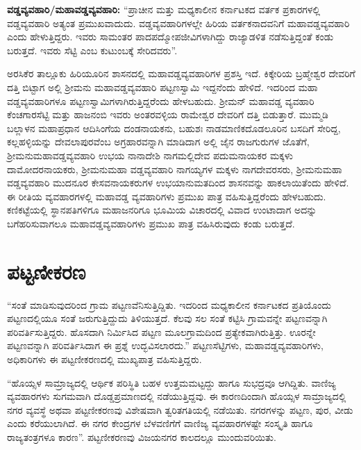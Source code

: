 \textbf{ವಡ್ಡವ್ಯವಹಾರಿ/ಮಹಾವಡ್ಡವ್ಯವಹಾರಿ:} “ಪ್ರಾಚೀನ ಮತ್ತು ಮಧ್ಯಕಾಲೀನ ಕರ್ನಾಟಕದ ವರ್ತಕ ಪ್ರಕಾರಗಳಲ್ಲಿ ವಡ್ಡವ್ಯವಹಾರಿ ಅತ್ಯಂತ ಪ್ರಮುಖವಾದುದು. ವಡ್ಡವ್ಯವಹಾರಿಗಳಲ್ಲೇ ಹಿರಿಯ ವರ್ತಕನಾದವನಿಗೆ ಮಹಾವಡ್ಡವ್ಯವಹಾರಿ ಎಂದು ಹೇಳುತ್ತಿದ್ದರು. ಇವರು ಸಾಮಂತರ ಪಾದಪದ್ಮೋಪಜೀವಿಗಳಾಗಿದ್ದು ರಾಜ್ಯಾಡಳಿತ ನಡೆಸುತ್ತಿದ್ದಂತೆ ಕಂಡು ಬರುತ್ತದೆ. ಇವರು ಸೆಟ್ಟಿ ಎಂಬ ಕುಟುಂಬಕ್ಕೆ ಸೇರಿದವರು”.

ಅರಸಿಕೆರ ತಾಲ್ಲೂಕು ಹಿರಿಯೂರಿನ ಶಾಸನದಲ್ಲಿ ಮಹಾವಡ್ಡವ್ಯವಹಾರಿಗಳ ಪ್ರಶಸ್ತಿ ಇದೆ. ಕಿಕ್ಕೇರಿಯ ಬ್ರಹ್ಮೇಶ್ವರ ದೇವರಿಗೆ ದತ್ತಿ ಬಿಟ್ಟಾಗ ಅಲ್ಲಿ ಶ‍್ರೀಮನು ಮಹಾವಡ್ಡವ್ಯವಹಾರಿ ಪಟ್ಟಣಸ್ವಾಮಿ ಇದ್ದನೆಂದು ಹೇಳಿದೆ. ಇದರಿಂದ ಮಹಾ ವಡ್ಡವ್ಯವಹಾರಿಗಳೂ ಪಟ್ಟಣಸ್ವಾಮಿಗಳಾಗಿರುತ್ತಿದ್ದರೆಂದು ಹೇಳಬಹುದು. ಶ‍್ರೀಮನ್​ ಮಹಾವಡ್ಡ ವ್ಯವಹಾರಿ ಕೆಂಚಗಾರಸೆಟ್ಟಿ ಮತ್ತು ಹಾಜನಂಬಿ ಇವರು ಅಂತರವಳ್ಳಿಯ ರಾಮೇಶ್ವರ ದೇವರಿಗೆ ದತ್ತಿ ಬಿಡುತ್ತಾರೆ. ಮುಮ್ಮಡಿ ಬಲ್ಲಾಳನ ಮಹಾಪ್ರಧಾನ ಆದಿಸಿಂಗೆಯ ದಂಡನಾಯಕನು, ಬಹುಶಃ ನಾಡಮಾಣಿಕದೊಡಲೂರಿನ ಬಸದಿಗೆ ಸೇರಿದ್ದ, ಕಲ್ಲಹಳ್ಳಿಯನ್ನು ದೇವಲಾಪುರವೆಂಬ ಅಗ್ರಹಾರವನ್ನಾಗಿ ಮಾಡಿದಾಗ ಅಲ್ಲಿ ಜೈನ ರಾಜಗುರುಗಳ ಜೊತೆಗೆ, ಶ‍್ರೀಮನುಮಹಾವಡ್ಡವ್ಯವಹಾರಿ ಉಭಯ ನಾನಾದೇಶಿ ನಾಗಮಲ್ಲಿದೇವ ಪದುಮನಾಯಕರ ಮಕ್ಕಳು ದಾಮೋದರನಾಯಕರು, ಶ‍್ರೀಮನುಮಹಾ ವಡ್ಡವ್ಯವಹಾರಿ ನಾಗಯ್ಯಗಳ ಮಕ್ಕಳು ನಾಗದೇವರಸರು, ಶ‍್ರೀಮನುಮಹಾ ವಡ್ಡವ್ಯವಹಾರಿ ಮುದನೂರ ಕೇಸವನಾಯಕರುಗಳ ಉಭಯಾನುಮತದಿಂದ ಶಾಸನವನ್ನು ಹಾಕಲಾಯಿತೆಂದು ಹೇಳಿದೆ. ಈ ರೀತಿಯ ವ್ಯವಹಾರಗಳಲ್ಲಿ ಮಹಾವಡ್ಡ ವ್ಯವಹಾರಿಗಳು ಪ್ರಮುಖ ಪಾತ್ರ ವಹಿಸುತ್ತಿದ್ದರೆಂದು ಹೇಳಬಹುದು. ಕಣಿಕಟ್ಟೆಯಲ್ಲಿ ಸ್ಥಾನಪತಿಗಳಿಗೂ ಮಹಾಜನರಿಗೂ ಭೂಮಿಯ ವಿಚಾರದಲ್ಲಿ ವಿವಾದ ಉಂಟಾದಾಗ ಅದನ್ನು ಬಗೆಹರಿಸುವಾಗಲೂ ಮಹಾವಡ್ಡವ್ಯವಹಾರಿಗಳು ಪ್ರಮುಖ ಪಾತ್ರ ವಹಿಸಿರುವುದು ಕಂಡು ಬರುತ್ತದೆ.


\section{ಪಟ್ಟಣೀಕರಣ}

“ಸಂತೆ ಮಾಡಿಸುವುದರಿಂದ ಗ್ರಾಮ ಪಟ್ಟಣವೆನಿಸುತ್ತಿದ್ದಿತು. ಇದರಿಂದ ಮಧ್ಯಕಾಲೀನ ಕರ್ನಾಟಕದ ಪ್ರತಿಯೊಂದು ಪಟ್ಟಣದಲ್ಲಿಯೂ ಸಂತೆ ಜರುಗುತ್ತಿದ್ದುದು ತಿಳಿಯುತ್ತದೆ. ಕೆಲವು ಸಲ ಸಂತೆ ಕಟ್ಟಿಸಿ ಗ್ರಾಮವನ್ನೇ ಪಟ್ಟಣವನ್ನಾಗಿ ಪರಿವರ್ತಿಸುತ್ತಿದ್ದರು. ಹೊಸದಾಗಿ ನಿರ್ಮಿಸಿದ ಪಟ್ಟಣ ಮೂಲಗ್ರಾಮದಿಂದ ಪ್ರತ್ಯೇಕವಾಗಿರುತ್ತಿತ್ತು. ಊರನ್ನೇ ಪಟ್ಟಣವನ್ನಾಗಿ ಪರಿವರ್ತಿಸಿದಾಗ ಈ ಪ್ರಶ್ನೆ ಉದ್ಭವಿಸಲಾರದು.” ಪಟ್ಟಣಸೆಟ್ಟಿಗಳು, ಮಹಾವಡ್ಡವ್ಯವಹಾರಿಗಳು, ಅಧಿಕಾರಿಗಳು ಈ ಪಟ್ಟಣೀಕರಣದಲ್ಲಿ ಮುಖ್ಯಪಾತ್ರ ವಹಿಸುತ್ತಿದ್ದರು.

“ಹೊಯ್ಸಳ ಸಾಮ್ರಾಜ್ಯದಲ್ಲಿ ಆರ್ಥಿಕ ಪರಿಸ್ಥಿತಿ ಬಹಳ ಉತ್ತಮಮಟ್ಟದ್ದು ಹಾಗೂ ಸುಭದ್ರವೂ ಆಗಿದ್ದಿತು. ವಾಣಿಜ್ಯ ವ್ಯವಹಾರಗಳು ಸುಗಮವಾಗಿ ದೊಡ್ಡಪ್ರಮಾಣದಲ್ಲಿ ನಡೆಯುತ್ತಿದ್ದವು. ಈ ಕಾರಣದಿಂದಾಗಿ ಹೊಯ್ಸಳ ಸಾಮ್ರಾಜ್ಯದಲ್ಲಿ ನಗರ ವ್ಯವಸ್ಥೆ ಅಥವಾ ಪಟ್ಟಣೀಕರಣವು ವಿಶೇಷವಾಗಿ ತ್ವರಿತಗತಿಯಲ್ಲಿ ನಡೆಯಿತು. ನಗರಗಳನ್ನು ಪಟ್ಟಣ, ಪುರ, ವೀಡು ಎಂದು ಕರೆಯುಲಾಗಿದೆ. ಈ ನಗರ ಕೇಂದ್ರಗಳ ಬೆಳವಣಿಗೆಗೆ ವಾಣಿಜ್ಯ ವ್ಯವಹಾರಗಳಷ್ಟೇ ಸಂಸ್ಕೃತಿ ಹಾಗೂ ರಾಜ್ಯತಂತ್ರಗಳೂ ಕಾರಣ”. ಪಟ್ಟಣೀಕರಣವು ವಿಜಯನಗರ ಕಾಲದಲ್ಲೂ ಮುಂದುವರಿಯಿತು.

